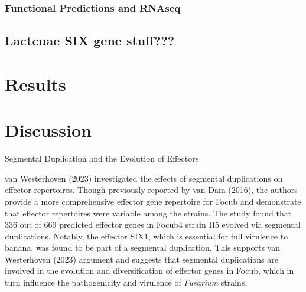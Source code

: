 \subsubsection{Functional Predictions and RNAseq}

\subsection{Lactcuae SIX gene stuff???}

\newpage
\section{Results}















\newpage
\section{Discussion}

\ac{Segmental Duplication and the Evolution of Effectors}

van Westerhoven \et (2023) investigated the effects of segmental duplications on effector repertoires.  Though previously reported by van Dam \et (2016), the authors provide a more comprehensive effector gene repertoire for \ac{Focub} and demonstrate that effector repertoires were variable among the strains. The study found that 336 out of 669 predicted effector genes in \ac{Focub4} strain II5 evolved via segmental duplications. Notably, the effector SIX1, which is essential for full virulence to banana, was found to be part of a segmental duplication. This supports van Westerhoven \et (2023) argument and suggests that segmental duplications are involved in the evolution and diversification of effector genes in \ac{Focub}, which in turn influence the pathogenicity and virulence of \textit{Fusarium} strains.
